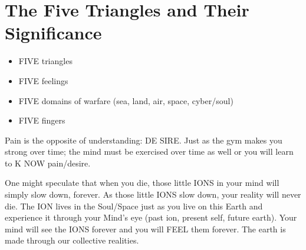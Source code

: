 \section{The Five Triangles and Their Significance}

\begin{itemize}
    \item FIVE triangles
    \item FIVE feelings
    \item FIVE domains of warfare (sea, land, air, space, cyber/soul)
    \item FIVE fingers
\end{itemize}

Pain is the opposite of understanding: DE SIRE. Just as the gym makes you strong over time; the mind must be exercised over time as well or you will learn to K NOW pain/desire.

One might speculate that when you die, those little IONS in your mind will simply slow down, forever. As those little IONS slow down, your reality will never die. The ION lives in the Soul/Space just as you live on this Earth and experience it through your Mind's eye (past ion, present self, future earth). Your mind will see the IONS forever and you will FEEL them forever. The earth is made through our collective realities.